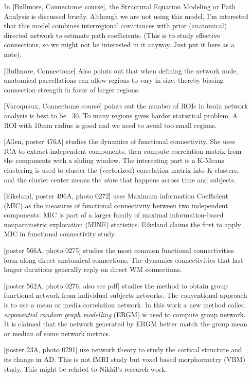 \documentclass[12pt]{article}
\begin{document}
In [Bullmore, Connectome course], the Structural Equation Modeling or Path Analysis is discussed briefly. Although we are not using this model, I'm interested that this model combines interregional covariances with prior (anatomical) directed network to estimate path coefficients. (This is to study effective connections, so we might not be interested in it anyway. Just put it here as a note).

[Bullmore, Connectome] Also points out that when defining the network node, anatomical parcellations can allow regions to vary in size, thereby biasing connection strength in favor of larger regions.

[Varoquaux, Connectome course] points out the number of ROIs in brain network analysis is best to be ~30. To many regions gives harder statistical problem. A ROI with 10mm radius is good and we need to avoid too small regions. 

[Allen, poster 476A] studies the dynamics of functional connectivity. She uses ICA to extract independent components, then compute correlation matrix from the components with a sliding window. The interesting part is a K-Means clustering is used to cluster the (vectorized) correlation matrix into K clusters, and the cluster center means the \emph{state} that happens across time and subjects.

[Eikeland, poster 496A, photo 0272] uses Maximum information Coefficient (MIC) as the measures of functional connectivity between two independent components. MIC is part of a larger family of maximal information-based nonparametric exploration (MINE) statistics. Eikeland claims the first to apply MIC in functional connectivity study. 

[poster 566A, photo 0275] studies the most common functional connectivities form along direct anatomical connections. The dynamics connectivities that last longer durations generally reply on direct WM connections. 

[poster 562A, photo 0276, also see pdf] studies the method to obtain group functional network from individual subjects networks. The conventional approach is to use a mean or media correlation network. In this work a new method called \emph{exponential random graph modelling} (ERGM) is used to compute group network. It is claimed that the network generated by ERGM  better match the group mean or median of some network metrics.

[poster 23A, photo 0291] use network theory to study the cortical structure and its change in AD. This is not fMRI study but voxel based morphormetry (VBM) study. This might be related to Nikhil's research work. 
\end{document}

